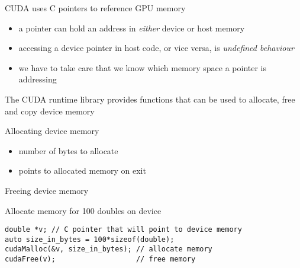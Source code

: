 \begin{frame}[fragile]{}
    \begin{info}{CUDA uses C pointers to reference GPU memory}
        \centering {}
        \begin{itemize}
            \item a pointer can hold an address in \emph{either} device or host memory
            \item accessing a device pointer in host code, or vice versa, is \emph{undefined behaviour}
            \item we have to take care that we know which memory space a pointer is addressing
        \end{itemize}
        The CUDA runtime library provides functions that can be used to allocate, free and copy device memory
    \end{info}

\end{frame}

\begin{frame}[fragile]{}
    \begin{info}{Allocating device memory}
        \centering {}
    \begin{itemize}
        \item {} number of bytes to allocate
        \item {} points to allocated memory on exit
    \end{itemize}
    \end{info}

    \begin{info}{Freeing device memory}
        \centering {}
    \end{info}

    \begin{code}{Allocate memory for 100 doubles on device}
        \begin{lstlisting}[style=boxcuda]
double *v; // C pointer that will point to device memory
auto size_in_bytes = 100*sizeof(double);
cudaMalloc(&v, size_in_bytes); // allocate memory
cudaFree(v);                   // free memory
\end{lstlisting}
    \end{code}
\end{frame}

